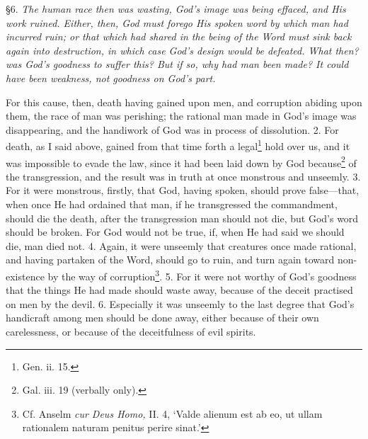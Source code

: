 
§6. \emph{The human race then was wasting, God’s image was being effaced, and His work ruined. Either, then, God must forego His spoken word by which man had incurred ruin; or that which had shared in the being of the Word must sink back again into destruction, in which case God’s design would be defeated. What then? was God’s goodness to suffer this? But if so, why had man been made? It could have been weakness, not goodness on God’s part.}

For this cause, then, death having gained upon men, and corruption abiding upon them, the race of man was perishing; the rational man made in God’s image was disappearing, and the handiwork of God was in process of dissolution. 2. For death, as I said above, gained from that time forth a legal\footnote{Gen. ii. 15.} hold over us, and it was impossible to evade the law, since it had been laid down by God because\footnote{Gal. iii. 19 (verbally only).} of the transgression, and the result was in truth at once monstrous and unseemly. 3. For it were monstrous, firstly, that God, having spoken, should prove false—that, when once He had ordained that man, if he transgressed the commandment, should die the death, after the transgression man should not die, but God’s word should be broken. For God would not be true, if, when He had said we should die, man died not. 4. Again, it were unseemly that creatures once made rational, and having partaken of the Word, should go to ruin, and turn again toward non-existence by the way of corruption\footnote{Cf. Anselm \emph{cur Deus Homo,} II. 4, ‘Valde alienum est ab eo, ut ullam rationalem naturam penitus perire sinat.’}. 5. For it were not worthy of God’s goodness that the things He had made should waste away, because of the deceit practised on men by the devil. 6. Especially it was unseemly to the last degree that God’s handicraft among men should be done away, either because of their own carelessness, or because of the deceitfulness of evil spirits.

